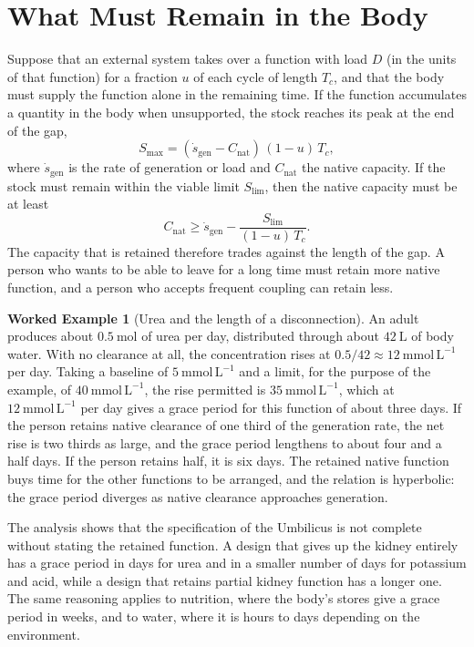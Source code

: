 \documentclass[11pt,openany]{book}
\theoremstyle{definition}
\newtheorem{example}{Worked Example}[chapter]
\theoremstyle{remark}
\begin{document}
\section{What Must Remain in the Body}

Suppose that an external system takes over a function with load $D$ (in the units of that function) for a fraction $u$ of each cycle of length $T_c$, and that the body must supply the function alone in the remaining time. If the function accumulates a quantity in the body when unsupported, the stock reaches its peak at the end of the gap,
\begin{equation}
S_{\max}=(\dot s_{\mathrm{gen}}-C_{\mathrm{nat}})\,(1-u)\,T_c,
\label{eq:gap}
\end{equation}
where $\dot s_{\mathrm{gen}}$ is the rate of generation or load and $C_{\mathrm{nat}}$ the native capacity. If the stock must remain within the viable limit $S_{\lim}$, then the native capacity must be at least
\begin{equation}
C_{\mathrm{nat}}\ge\dot s_{\mathrm{gen}}-\frac{S_{\lim}}{(1-u)\,T_c}.
\label{eq:cnat}
\end{equation}
The capacity that is retained therefore trades against the length of the gap. A person who wants to be able to leave for a long time must retain more native function, and a person who accepts frequent coupling can retain less.

\begin{example}[Urea and the length of a disconnection]
\label{ex:disconnect}
An adult produces about $0.5\ \mathrm{mol}$ of urea per day, distributed through about $42\ \mathrm{L}$ of body water. With no clearance at all, the concentration rises at $0.5/42\approx12\ \mathrm{mmol\,L^{-1}}$ per day. Taking a baseline of $5\ \mathrm{mmol\,L^{-1}}$ and a limit, for the purpose of the example, of $40\ \mathrm{mmol\,L^{-1}}$, the rise permitted is $35\ \mathrm{mmol\,L^{-1}}$, which at $12\ \mathrm{mmol\,L^{-1}}$ per day gives a grace period for this function of about three days. If the person retains native clearance of one third of the generation rate, the net rise is two thirds as large, and the grace period lengthens to about four and a half days. If the person retains half, it is six days. The retained native function buys time for the other functions to be arranged, and the relation is hyperbolic: the grace period diverges as native clearance approaches generation.
\end{example}

The analysis shows that the specification of the Umbilicus is not complete without stating the retained function. A design that gives up the kidney entirely has a grace period in days for urea and in a smaller number of days for potassium and acid, while a design that retains partial kidney function has a longer one. The same reasoning applies to nutrition, where the body's stores give a grace period in weeks, and to water, where it is hours to days depending on the environment.
\end{document}
